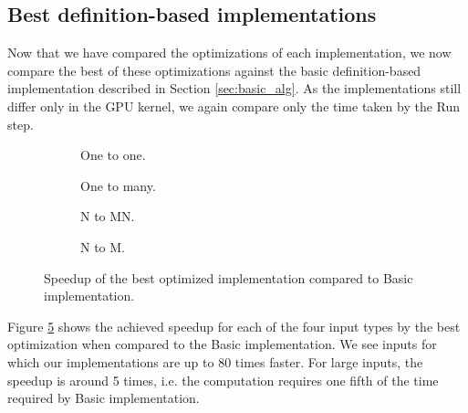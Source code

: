\subsection{Best definition-based implementations}
\label{sec:results_definition_based}

Now that we have compared the optimizations of each implementation, we now compare the best of these optimizations against the basic definition-based implementation described in Section \ref{sec:basic_alg}. As the implementations still differ only in the GPU kernel, we again compare only the time taken by the Run step.


\begin{figure}[ht]
	\centering	
	\begin{subfigure}{0.35\textwidth}
		\centering
		\def\svgwidth{\textwidth}
		
		\caption{One to one.}
		\label{fig:definition_based_speedup_one_to_one}
	\end{subfigure}
	\begin{subfigure}{0.35\textwidth}
		\centering
		\def\svgwidth{\textwidth}
		
		\caption{One to many.}
		\label{fig:definition_based_speedup_one_to_many}
	\end{subfigure}
	\begin{subfigure}{0.35\textwidth}
		\centering
		\def\svgwidth{\textwidth}
		
		\caption{N to MN.}
		\label{fig:definition_based_speedup_n_to_mn}
	\end{subfigure}
	\begin{subfigure}{0.35\textwidth}
		\centering
		\def\svgwidth{\textwidth}
		
		\caption{N to M.}
		\label{fig:definition_based_speedup_n_to_m}
	\end{subfigure}
	\caption{Speedup of the best optimized implementation compared to Basic implementation.}
	\label{fig:definition_based_speedup}
\end{figure}

Figure \ref{fig:definition_based_speedup} shows the achieved speedup for each of the four input types by the best optimization when compared to the Basic implementation. We see inputs for which our implementations are up to 80 times faster. For large inputs, the speedup is around 5 times, i.e. the computation requires one fifth of the time required by Basic implementation.

